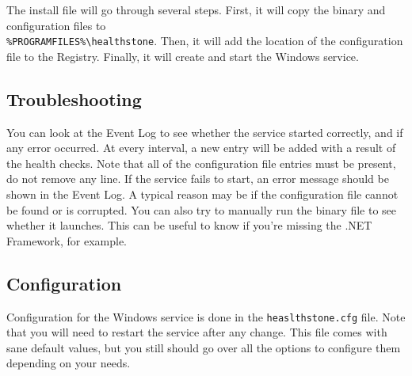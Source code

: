 \documentclass[11pt]{article}
\begin{document}
The install file will go through several steps. First, it will copy the binary and configuration files to\\ \texttt{\%PROGRAMFILES\%\textbackslash healthstone}. Then, it will add the location of the configuration file to the Registry. Finally, it will create and start the Windows service.

\subsection{Troubleshooting}

You can look at the Event Log to see whether the service started correctly, and if any error occurred. At every interval, a new entry will be added with a result of the health checks. Note that all of the configuration file entries must be present, do not remove any line. If the service fails to start, an error message should be shown in the Event Log. A typical reason may be if the configuration file cannot be found or is corrupted. You can also try to manually run the binary file to see whether it launches. This can be useful to know if you're missing the .NET Framework, for example.

\subsection{Configuration}
Configuration for the Windows service is done in the \texttt{heaslthstone.cfg} file. Note that you will need to restart the service after any change. This file comes with sane default values, but you still should go over all the options to configure them depending on your needs.
\end{document}
